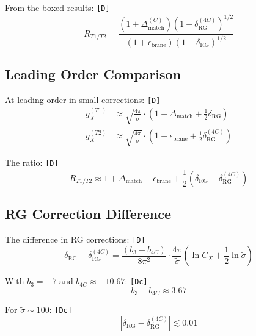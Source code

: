 \documentclass[11pt,a4paper]{article}
\newcommand{\tagD}{\textcolor{green!50!black}{\texttt{[D]}}}
\newcommand{\tagDc}{\textcolor{blue!70!black}{\texttt{[Dc]}}}
\theoremstyle{definition}
\begin{document}
From the boxed results: \tagD{}
\begin{equation}
\label{eq:consistency-ratio-expanded}
R_{T1/T2} = \frac{(1 + \Delta_{\text{match}}^{(C)})(1 - \delta_{\text{RG}}^{(4C)})^{1/2}}{(1 + \epsilon_{\text{brane}})(1 - \delta_{\text{RG}})^{1/2}}
\end{equation}

\subsection{Leading Order Comparison}
\label{subsec:leading-order}

At leading order in small corrections: \tagD{}
\begin{align}
\label{eq:leading-t1}
g_X^{(T1)} &\approx \sqrt{\frac{4\pi}{\tilde{\sigma}}} \cdot \left(1 + \Delta_{\text{match}} + \frac{1}{2}\delta_{\text{RG}}\right) \\
\label{eq:leading-t2}
g_X^{(T2)} &\approx \sqrt{\frac{4\pi}{\tilde{\sigma}}} \cdot \left(1 + \epsilon_{\text{brane}} + \frac{1}{2}\delta_{\text{RG}}^{(4C)}\right)
\end{align}

The ratio: \tagD{}
\begin{equation}
\label{eq:ratio-leading}
R_{T1/T2} \approx 1 + \Delta_{\text{match}} - \epsilon_{\text{brane}} + \frac{1}{2}(\delta_{\text{RG}} - \delta_{\text{RG}}^{(4C)})
\end{equation}

\subsection{RG Correction Difference}
\label{subsec:rg-difference}

The difference in RG corrections: \tagD{}
\begin{equation}
\label{eq:rg-diff}
\delta_{\text{RG}} - \delta_{\text{RG}}^{(4C)} = \frac{(b_3 - b_{4C})}{8\pi^2} \cdot \frac{4\pi}{\tilde{\sigma}} \left(\ln C_X + \frac{1}{2}\ln\tilde{\sigma}\right)
\end{equation}

With $b_3 = -7$ and $b_{4C} \approx -10.67$: \tagDc{}
\begin{equation}
\label{eq:beta-diff}
b_3 - b_{4C} \approx 3.67
\end{equation}

For $\tilde{\sigma} \sim 100$: \tagDc{}
\begin{equation}
\label{eq:rg-diff-estimate}
|\delta_{\text{RG}} - \delta_{\text{RG}}^{(4C)}| \lesssim 0.01
\end{equation}
\end{document}
